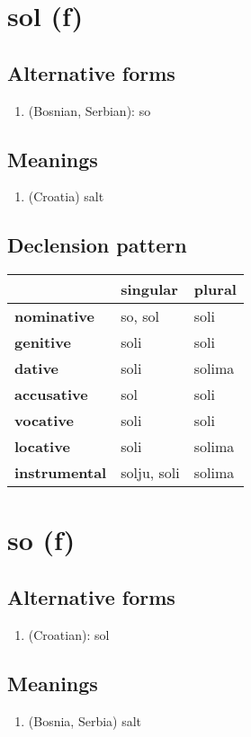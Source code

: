 \filbreak
\section{sol (f)}
\subsection*{Alternative forms}
\begin{enumerate}
\item (Bosnian, Serbian): so
\end{enumerate}
\subsection*{Meanings}
\begin{enumerate}
\item (Croatia) salt
\end{enumerate}
\subsection*{Declension pattern}
\begin{tabularx}{\linewidth}{Xll}
\toprule
{} &     singular &  plural \\
\midrule
\textbf{nominative  } &      so, sol &    soli \\
\textbf{genitive    } &         soli &    soli \\
\textbf{dative      } &         soli &  solima \\
\textbf{accusative  } &          sol &    soli \\
\textbf{vocative    } &         soli &    soli \\
\textbf{locative    } &         soli &  solima \\
\textbf{instrumental} &  solju, soli &  solima \\
\bottomrule
\end{tabularx}

\filbreak
\section{so (f)}
\subsection*{Alternative forms}
\begin{enumerate}
\item (Croatian): sol
\end{enumerate}
\subsection*{Meanings}
\begin{enumerate}
\item (Bosnia, Serbia) salt
\end{enumerate}
